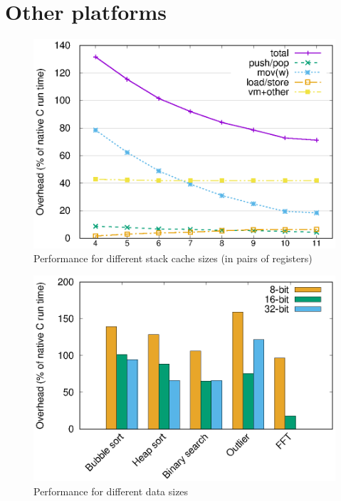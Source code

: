 \section{Other platforms}
\label{sec-evaluation-other-platforms}



\begin{figure}
    \centering
    \includegraphics[width=\myfiguresizeperformance]{cachesize-performance-per-opcode-category.eps}
    \caption{Performance for different stack cache sizes (in pairs of registers)}
    \label{fig-performance-per-opcode-category-per-cachesize}
\end{figure}

\begin{figure}
    \centering
    \includegraphics[width=\myfiguresizeperformance]{8_16_32_bit.eps}
    \caption{Performance for different data sizes}
    \label{fig-8_16_32_bit}
\end{figure}


